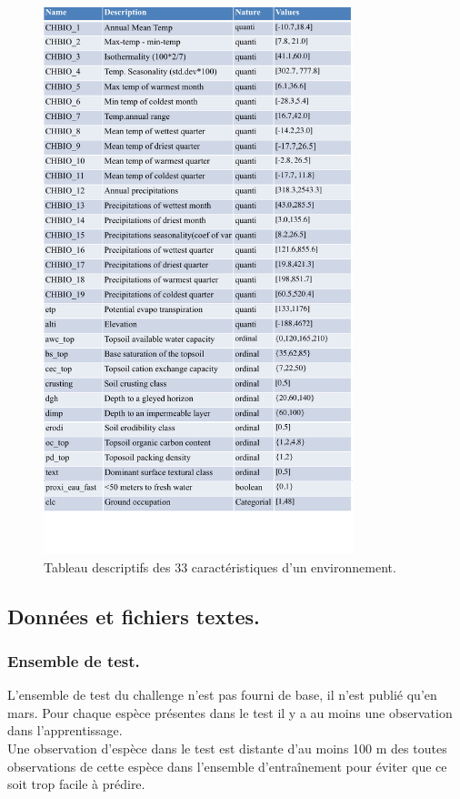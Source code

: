 \documentclass{article}
\begin{document}
\begin{figure}[H]
	\center
	\includegraphics[width=9cm]{figure/figure4.png} 
	 \caption{Tableau descriptifs des 33 caractéristiques d'un environnement.}
\end{figure}
\subsection{Données et fichiers textes.}
\subsubsection{Ensemble de test.}
L’ensemble de test du challenge n’est pas fourni de base, il n’est publié qu’en mars. Pour chaque espèce présentes dans le test il y a au moins une observation dans l’apprentissage.\\ Une observation d’espèce dans le test est distante d’au moins 100 m des toutes observations de cette espèce dans l’ensemble d'entraînement pour éviter que ce soit trop facile à prédire.
\end{document}
